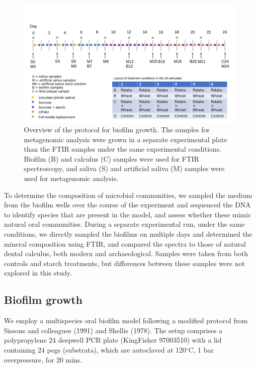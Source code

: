 \documentclass[
]{article}
\begin{document}
\begin{figure}

{\centering \includegraphics{figures/Exp_protocol.png}

}

\caption{\label{fig-protocol}Overview of the protocol for biofilm
growth. The samples for metagenomic analysis were grown in a separate
experimental plate than the FTIR samples under the same experimental
conditions. Biofilm (B) and calculus (C) samples were used for FTIR
spectroscopy, and saliva (S) and artificial saliva (M) samples were used
for metagenomic analysis.}

\end{figure}

To determine the composition of microbial communities, we sampled the
medium from the biofilm wells over the course of the experiment and
sequenced the DNA to identify species that are present in the model, and
assess whether these mimic natural oral communities. During a separate
experimental run, under the same conditions, we directly sampled the
biofilms on multiple days and determined the mineral composition using
FTIR, and compared the spectra to those of natural dental calculus, both
modern and archaeological. Samples were taken from both controls and
starch treatments, but differences between these samples were not
explored in this study.

\hypertarget{biofilm-growth}{%
\subsection{Biofilm growth}\label{biofilm-growth}}

We employ a multispecies oral biofilm model following a modified
protocol from Sissons and colleagues (1991) and Shellis (1978). The
setup comprises a polypropylene 24 deepwell PCR plate (KingFisher
97003510) with a lid containing 24 pegs (substrata), which are
autoclaved at 120\(^{\circ}\)C, 1 bar overpressure, for 20 mins.
\end{document}
